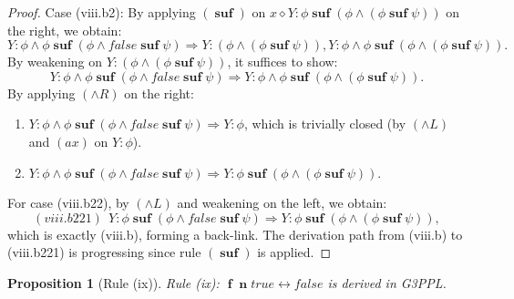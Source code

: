 \documentclass[manuscript,screen]{acmart}
\newtheorem{prop}{Proposition}[section]
\newcommand{\true}[0]{\mathit{true}}
\newcommand{\false}[0]{\mathit{false}}
\newcommand{\cat}[0]{\diamond}
\newcommand{\GiiiPPLcyc}[0]{\mbox{G3PPL}}
\DeclareMathOperator{\ofst}{\mathbf{f}}
\DeclareMathOperator{\osuf}{\mathbf{suf}}
\DeclareMathOperator{\nxt}{\mathbf{n}}
\begin{document}
\begin{proof}
Case (viii.b2): By applying $(\osuf)$ on $x\cat Y : \phi\osuf(\phi\wedge(\phi\osuf\psi))$ on the right, we obtain:
$$
Y : \phi\wedge \phi\osuf(\phi\wedge \false\osuf\psi)\Rightarrow Y : (\phi\wedge(\phi\osuf\psi)), Y : \phi\wedge \phi\osuf(\phi\wedge(\phi\osuf\psi)). 
$$
By weakening on $Y : (\phi\wedge(\phi\osuf\psi))$, it suffices to show:
$$
Y : \phi\wedge \phi\osuf(\phi\wedge \false\osuf\psi)\Rightarrow Y : \phi\wedge \phi\osuf(\phi\wedge(\phi\osuf\psi)). 
$$
By applying $(\wedge R)$ on the right:
\begin{enumerate}
    \item[(viii.b21)] $Y : \phi\wedge \phi\osuf(\phi\wedge \false\osuf\psi)\Rightarrow Y : \phi$, which is trivially closed (by $(\wedge L)$ and $(\textit{ax})$ on $Y:\phi$).
    \item[(viii.b22)] $Y : \phi\wedge \phi\osuf(\phi\wedge \false\osuf\psi)\Rightarrow Y : \phi\osuf(\phi\wedge(\phi\osuf\psi))$. 
\end{enumerate}
For case (viii.b22), by $(\wedge L)$ and weakening on the left, we obtain:
$$
(viii.b221)\ \ Y : \phi\osuf(\phi\wedge \false\osuf\psi)\Rightarrow Y : \phi\osuf(\phi\wedge(\phi\osuf\psi)), 
$$
which is exactly (viii.b), forming a back-link. The derivation path from (viii.b) to (viii.b221) is progressing since rule $(\osuf)$ is applied.
\fi

\end{proof}

\begin{prop}[Rule (ix)]
Rule (ix): 
$\ofst\nxt \true \leftrightarrow \false$
is derived in \GiiiPPLcyc. 
\end{prop}
\end{document}
